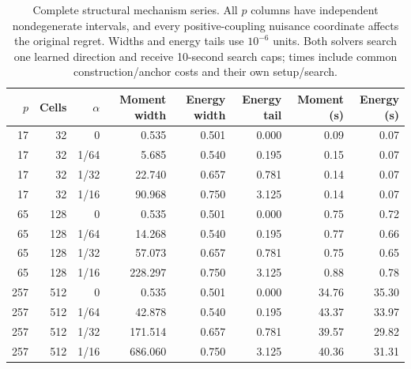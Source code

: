 \begin{table}[t]\caption{Complete structural mechanism series. All $p$ columns have independent nondegenerate intervals, and every positive-coupling nuisance coordinate affects the original regret. Widths and energy tails use $10^{-6}$ units. Both solvers search one learned direction and receive 10-second search caps; times include common construction/anchor costs and their own setup/search.}\label{tab:structure}\centering\small\setlength{\tabcolsep}{4pt}\begin{tabular}{rrrrrrrr}\toprule $p$&Cells&$\alpha$&Moment width&Energy width&Energy tail&Moment (s)&Energy (s)\\\midrule
17&32&0&0.535&0.501&0.000&0.09&0.07\\
17&32&1/64&5.685&0.540&0.195&0.15&0.07\\
17&32&1/32&22.740&0.657&0.781&0.14&0.07\\
17&32&1/16&90.968&0.750&3.125&0.14&0.07\\
65&128&0&0.535&0.501&0.000&0.75&0.72\\
65&128&1/64&14.268&0.540&0.195&0.77&0.66\\
65&128&1/32&57.073&0.657&0.781&0.75&0.65\\
65&128&1/16&228.297&0.750&3.125&0.88&0.78\\
257&512&0&0.535&0.501&0.000&34.76&35.30\\
257&512&1/64&42.878&0.540&0.195&43.37&33.97\\
257&512&1/32&171.514&0.657&0.781&39.57&29.82\\
257&512&1/16&686.060&0.750&3.125&40.36&31.31\\\bottomrule\end{tabular}\end{table}
